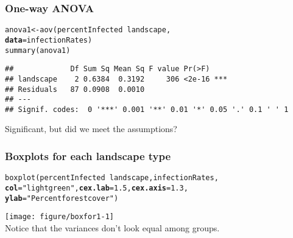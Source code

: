 \documentclass[color=usenames,dvipsnames]{beamer}\usepackage[]{graphicx}\usepackage[]{color}
\makeatletter
\newcommand{\hlnum}[1]{\textcolor[rgb]{0.69,0.494,0}{#1}}%
\newcommand{\hlstr}[1]{\textcolor[rgb]{0.749,0.012,0.012}{#1}}%
\newcommand{\hlopt}[1]{\textcolor[rgb]{0,0,0}{#1}}%
\newcommand{\hlstd}[1]{\textcolor[rgb]{0,0,0}{#1}}%
\newcommand{\hlkwb}[1]{\textcolor[rgb]{0,0.341,0.682}{#1}}%
\newcommand{\hlkwc}[1]{\textcolor[rgb]{0,0,0}{\textbf{#1}}}%
\newcommand{\hlkwd}[1]{\textcolor[rgb]{0.004,0.004,0.506}{#1}}%
\newenvironment{kframe}{%
 \def\at@end@of@kframe{}%
 \ifinner\ifhmode%
  \def\at@end@of@kframe{\end{minipage}}%
  \begin{minipage}{\columnwidth}%
 \fi\fi%
 \def\FrameCommand##1{\hskip\@totalleftmargin \hskip-\fboxsep
 \colorbox{shadecolor}{##1}\hskip-\fboxsep
     \hskip-\linewidth \hskip-\@totalleftmargin \hskip\columnwidth}%
 \MakeFramed {\advance\hsize-\width
   \@totalleftmargin\z@ \linewidth\hsize
   \@setminipage}}%
 {\par\unskip\endMakeFramed%
 \at@end@of@kframe}
\newenvironment{knitrout}{}{} %
\makeatother
\begin{document}
\begin{frame}[fragile]
  \frametitle{One-way ANOVA}
\begin{knitrout}\footnotesize
{}\color{fgcolor}\begin{kframe}
\begin{alltt}
\hlstd{anova1} \hlkwb{<-} \hlkwd{aov}\hlstd{(percentInfected} \hlopt{~} \hlstd{landscape,}
              \hlkwc{data}\hlstd{=infectionRates)}
\hlkwd{summary}\hlstd{(anova1)}
\end{alltt}
\begin{verbatim}
##             Df Sum Sq Mean Sq F value Pr(>F)    
## landscape    2 0.6384  0.3192     306 <2e-16 ***
## Residuals   87 0.0908  0.0010                   
## ---
## Signif. codes:  0 '***' 0.001 '**' 0.01 '*' 0.05 '.' 0.1 ' ' 1
\end{verbatim}
\end{kframe}
\end{knitrout}
\pause
\vfill
Significant, but did we meet the assumptions?
\end{frame}



\begin{frame}[fragile]
  \frametitle{Boxplots for each landscape type}
\begin{knitrout}\footnotesize
{}\color{fgcolor}\begin{kframe}
\begin{alltt}
\hlkwd{boxplot}\hlstd{(percentInfected}\hlopt{~}\hlstd{landscape, infectionRates,}
        \hlkwc{col}\hlstd{=}\hlstr{"lightgreen"}\hlstd{,} \hlkwc{cex.lab}\hlstd{=}\hlnum{1.5}\hlstd{,} \hlkwc{cex.axis}\hlstd{=}\hlnum{1.3}\hlstd{,}
        \hlkwc{ylab}\hlstd{=}\hlstr{"Percent forest cover"}\hlstd{)}
\end{alltt}
\end{kframe}
\end{knitrout}
\vspace{-0.5cm}
\centering
\texttt{[image: figure/boxfor1-1]} \\
\vfill
Notice that the variances don't look equal among groups.
\end{frame}
\end{document}
